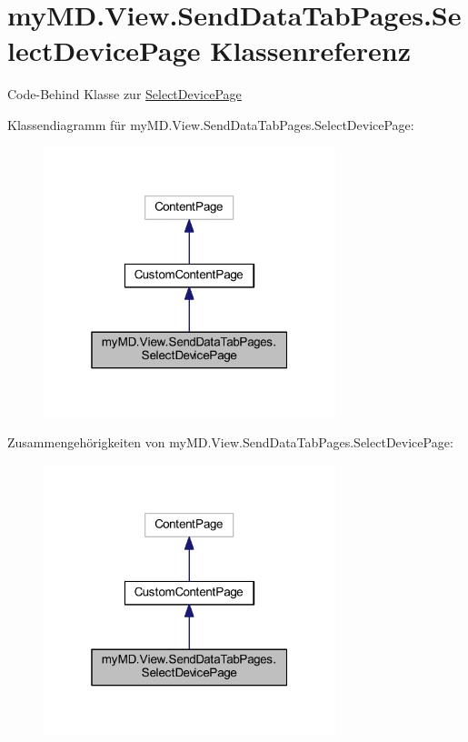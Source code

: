 \hypertarget{classmy_m_d_1_1_view_1_1_send_data_tab_pages_1_1_select_device_page}{}\section{my\+M\+D.\+View.\+Send\+Data\+Tab\+Pages.\+Select\+Device\+Page Klassenreferenz}
\label{classmy_m_d_1_1_view_1_1_send_data_tab_pages_1_1_select_device_page}


Code-\/\+Behind Klasse zur \mbox{\hyperlink{classmy_m_d_1_1_view_1_1_send_data_tab_pages_1_1_select_device_page}{Select\+Device\+Page}}  




Klassendiagramm für my\+M\+D.\+View.\+Send\+Data\+Tab\+Pages.\+Select\+Device\+Page\+:\nopagebreak
\begin{figure}[H]
\begin{center}
\leavevmode
\includegraphics[width=241pt]{classmy_m_d_1_1_view_1_1_send_data_tab_pages_1_1_select_device_page__inherit__graph}
\end{center}
\end{figure}


Zusammengehörigkeiten von my\+M\+D.\+View.\+Send\+Data\+Tab\+Pages.\+Select\+Device\+Page\+:\nopagebreak
\begin{figure}[H]
\begin{center}
\leavevmode
\includegraphics[width=241pt]{classmy_m_d_1_1_view_1_1_send_data_tab_pages_1_1_select_device_page__coll__graph}
\end{center}
\end{figure}

